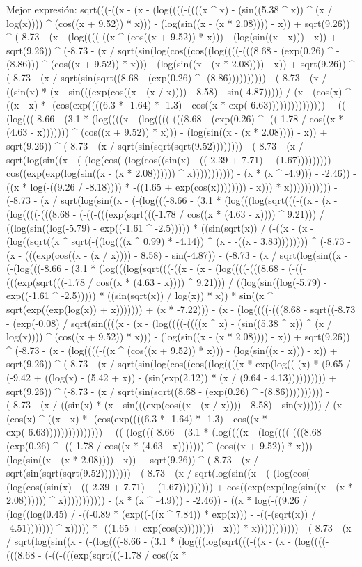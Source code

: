 Mejor expresión: sqrt(((-((x - (x - (log((((-((((x ^ x) - (sin((5.38 ^ x)) ^ (x / log(x)))) ^ (cos((x + 9.52)) * x))) - (log(sin((x - (x * 2.08)))) - x)) + sqrt(9.26)) ^ (-8.73 - (x - (log((((-((x ^ (cos((x + 9.52)) * x))) - (log(sin((x - x))) - x)) + sqrt(9.26)) ^ (-8.73 - (x / sqrt(sin(log(cos((cos((log((((-(((8.68 - (exp(0.26) ^ -(8.86))) ^ (cos((x + 9.52)) * x))) - (log(sin((x - (x * 2.08)))) - x)) + sqrt(9.26)) ^ (-8.73 - (x / sqrt(sin(sqrt((8.68 - (exp(0.26) ^ -(8.86)))))))))) - (-8.73 - (x / ((sin(x) * (x - sin(((exp(cos((x - (x / x)))) - 8.58) - sin(-4.87))))) / (x - (cos(x) ^ ((x - x) * -(cos(exp((((6.3 * -1.64) * -1.3) - cos((x * exp(-6.63))))))))))))))) - -((-(log(((-8.66 - (3.1 * (log((((x - (log((((-(((8.68 - (exp(0.26) ^ -((-1.78 / cos((x * (4.63 - x))))))) ^ (cos((x + 9.52)) * x))) - (log(sin((x - (x * 2.08)))) - x)) + sqrt(9.26)) ^ (-8.73 - (x / sqrt(sin(sqrt(sqrt(9.52)))))))) - (-8.73 - (x / sqrt(log(sin((x - (-(log(cos(-(log(cos((sin(x) - ((-2.39 + 7.71) - -(1.67))))))))) + cos((exp(exp(log(sin((x - (x * 2.08)))))) ^ x))))))))))) - (x * (x ^ -4.9))) - -2.46)) - ((x * log(-((9.26 / -8.18)))) * -((1.65 + exp(cos(x)))))))) - x))) * x))))))))))) - (-8.73 - (x / sqrt(log(sin((x - (-(log(((-8.66 - (3.1 * (log(((log(sqrt(((-((x - (x - (log((((-(((8.68 - (-((-(((exp(sqrt(((-1.78 / cos((x * (4.63 - x)))) ^ 9.21))) / ((log(sin((log(-5.79) - exp((-1.61 ^ -2.5))))) * ((sin(sqrt(x)) / (-((x - (x - (log((sqrt((x ^ sqrt(-((log(((x ^ 0.99) * -4.14)) ^ (x - -((x - 3.83)))))))) ^ (-8.73 - (x - (((exp(cos((x - (x / x)))) - 8.58) - sin(-4.87)) - (-8.73 - (x / sqrt(log(sin((x - (-(log(((-8.66 - (3.1 * (log(((log(sqrt(((-((x - (x - (log((((-(((8.68 - (-((-(((exp(sqrt(((-1.78 / cos((x * (4.63 - x)))) ^ 9.21))) / ((log(sin((log(-5.79) - exp((-1.61 ^ -2.5))))) * ((sin(sqrt(x)) / log(x)) * x)) * sin((x ^ sqrt(exp((exp(log(x)) + x))))))) + (x * -7.22))) - (x - (log((((-(((8.68 - sqrt((-8.73 - (exp(-0.08) / sqrt(sin((((x - (x - (log((((-((((x ^ x) - (sin((5.38 ^ x)) ^ (x / log(x)))) ^ (cos((x + 9.52)) * x))) - (log(sin((x - (x * 2.08)))) - x)) + sqrt(9.26)) ^ (-8.73 - (x - (log((((-((x ^ (cos((x + 9.52)) * x))) - (log(sin((x - x))) - x)) + sqrt(9.26)) ^ (-8.73 - (x / sqrt(sin(log(cos((cos((log((((x * exp(log((-(x) * (9.65 / (-9.42 + ((log(x) - (5.42 + x)) - (sin(exp(2.12)) * (x / (9.64 - 4.13)))))))))) + sqrt(9.26)) ^ (-8.73 - (x / sqrt(sin(sqrt((8.68 - (exp(0.26) ^ -(8.86)))))))))) - (-8.73 - (x / ((sin(x) * (x - sin(((exp(cos((x - (x / x)))) - 8.58) - sin(x))))) / (x - (cos(x) ^ ((x - x) * -(cos(exp((((6.3 * -1.64) * -1.3) - cos((x * exp(-6.63))))))))))))))) - -((-(log(((-8.66 - (3.1 * (log((((x - (log((((-(((8.68 - (exp(0.26) ^ -((-1.78 / cos((x * (4.63 - x))))))) ^ (cos((x + 9.52)) * x))) - (log(sin((x - (x * 2.08)))) - x)) + sqrt(9.26)) ^ (-8.73 - (x / sqrt(sin(sqrt(sqrt(9.52)))))))) - (-8.73 - (x / sqrt(log(sin((x - (-(log(cos(-(log(cos((sin(x) - ((-2.39 + 7.71) - -(1.67))))))))) + cos((exp(exp(log(sin((x - (x * 2.08)))))) ^ x))))))))))) - (x * (x ^ -4.9))) - -2.46)) - ((x * log(-((9.26 / (log((log(0.45) / -((-0.89 * (exp((-((x ^ 7.84)) * exp(x))) - -((-(sqrt(x)) / -4.51))))))) ^ x))))) * -((1.65 + exp(cos(x)))))))) - x))) * x))))))))))) - (-8.73 - (x / sqrt(log(sin((x - (-(log(((-8.66 - (3.1 * (log(((log(sqrt(((-((x - (x - (log((((-(((8.68 - (-((-(((exp(sqrt(((-1.78 / cos((x * 